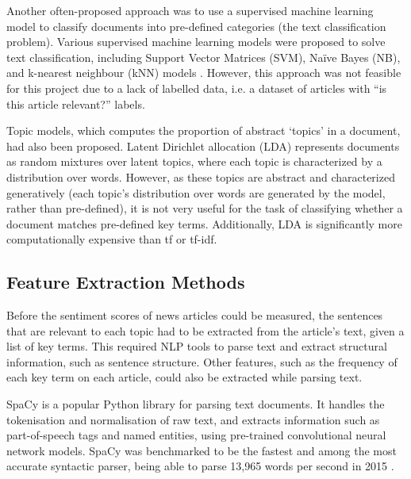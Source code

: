 \documentclass{report}
\begin{document}
Another often-proposed approach was to use a supervised machine learning model to classify documents into pre-defined categories (the text classification problem).
Various supervised machine learning models were proposed to solve text classification, including Support Vector Matrices (SVM), Na\"{i}ve Bayes (NB), and k-nearest neighbour (kNN) models \cite{khan2010review}.
However, this approach was not feasible for this project due to a lack of labelled data, i.e. a dataset of articles with ``is this article relevant?'' labels.

Topic models, which computes the proportion of abstract `topics' in a document, had also been proposed.
Latent Dirichlet allocation (LDA) \cite{blei2003latent} represents documents as random mixtures over latent topics, where each topic is characterized by a distribution over words.
However, as these topics are abstract and characterized generatively (each topic's distribution over words are generated by the model, rather than pre-defined), it is not very useful for the task of classifying whether a document matches pre-defined key terms.
Additionally, LDA is significantly more computationally expensive than tf or tf-idf.

\subsection{Feature Extraction Methods} \label{tc-matching}
Before the sentiment scores of news articles could be measured, the sentences that are relevant to each topic had to be extracted from the article's text, given a list of key terms.
This required NLP tools to parse text and extract structural information, such as sentence structure.
Other features, such as the frequency of each key term on each article, could also be extracted while parsing text.

SpaCy \cite{SpaCy} is a popular Python library for parsing text documents.
It handles the tokenisation and normalisation of raw text, and extracts information such as part-of-speech tags and named entities, using pre-trained convolutional neural network models.
SpaCy was benchmarked to be the fastest and among the most accurate syntactic parser, being able to parse 13,965 words per second in 2015 \cite{choi2015depends}.
\end{document}
